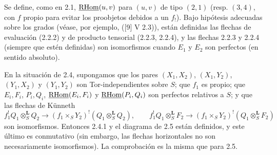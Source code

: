 Se define, como en 2.1, $\underline{\mathrm{RHom}}(u,v)$ para $(u,v)$ de tipo $(2,1)$ (resp. $(3,4)$, con $f$ propio para evitar los proobjetos debidos a un $f_!$). Bajo hipótesis adecuadas sobre los grados (véase, por ejemplo, ([9] V 2.3)), están definidas las flechas de evaluación (2.2.2) y de producto tensorial (2.2.3, 2.2.4), y las flechas 2.2.3 y 2.2.4 (siempre que estén definidas) son isomorfismos cuando $E_1$ y $E_2$ son perfectos (en sentido absoluto).

En la situación de 2.4, supongamos que los pares $(X_1,X_2)$, $(X_1,Y_2)$, $(Y_1,X_2)$ y $(Y_1,Y_2)$ son Tor-independientes sobre $S$; que $f_1$ es propio; que $E_i,F_i$, $P_i,Q_i$, $\underline{\mathrm{RHom}}(E_i,F_i)$ y $\underline{\mathrm{RHom}}(P_i,Q_i)$ son perfectos relativos a $S$; y que las flechas de Künneth
\[
f_1^!Q_1\otimes_S^{\mathbf L}Q_2\to(f_1\times_SY_2)^!(Q_1\otimes_S^{\mathbf L}Q_2),\qquad
f_1^!Q_1\otimes_S^{\mathbf L}F_2\to(f_1\times_SY_2)^!(Q_1\otimes_S^{\mathbf L}F_2)
\]
son isomorfismos. Entonces 2.4.1 y el diagrama de 2.5 están definidos, y este último es conmutativo (sin embargo, las flechas horizontales no son necesariamente isomorfismos). La comprobación es la misma que para 2.5.

